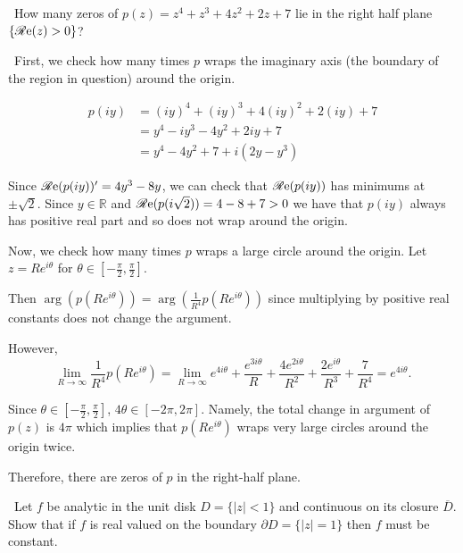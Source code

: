 \documentclass[12pt]{Qual}
\begin{document}
\newpage

\begin{problem} $\,$
How many zeros of $p(z)=z^4+z^3+4z^2+2z+7$ lie in the right half plane $\{\mathscr{R}\text{e}(z)>0\}$?
\end{problem}


\begin{solution}$\,$
First, we check how many times $p$ wraps the imaginary axis (the boundary of the region in question) around the origin.

\begin{align*}
    p(iy)&=(iy)^4+(iy)^3+4(iy)^2+2(iy)+7\\
    &=y^4-iy^3-4y^2+2iy+7\\
    &=y^4-4y^2+7+i(2y-y^3)
\end{align*}

Since $\mathscr{R}\text{e}(p(iy))'=4y^3-8y$, we can check that $\mathscr{R}\text{e}(p(iy))$ has minimums at $\pm\sqrt{2}$. Since $y\in\mathbb{R}$ and $\mathscr{R}\text{e}(p(i\sqrt{2}))=4-8+7>0$ we have that $p(iy)$ always has positive real part and so does not wrap around the origin.

Now, we check how many times $p$ wraps a large circle around the origin. Let $z=Re^{i\theta}$ for $\theta\in[-\frac{\pi}{2},\frac{\pi}{2}]$.

Then $\arg(p(Re^{i\theta}))=\arg(\frac{1}{R^4}p(Re^{i\theta}))$ since multiplying by positive real constants does not change the argument.

However, $$\lim_{R\to\infty}\frac{1}{R^4}p(Re^{i\theta})=\lim_{R\to\infty}e^{4i\theta}+\frac{e^{3i\theta}}{R}+\frac{4e^{2i\theta}}{R^2}+\frac{2e^{i\theta}}{R^3}+\frac{7}{R^4}=e^{4i\theta}.$$

Since $\theta\in[-\frac{\pi}{2},\frac{\pi}{2}]$, $4\theta\in[-2\pi,2\pi]$. Namely, the total change in argument of $p(z)$ is $4\pi$ which implies that $p(Re^{i\theta})$ wraps very large circles around the origin twice.

Therefore, there are  zeros of $p$ in the right-half plane.
\end{solution}
\newpage

\begin{problem} $\,$
Let $f$ be analytic in the unit disk $D=\{|z|<1\}$ and continuous on its closure $\overline{D}$. Show that if $f$ is real valued on the boundary $\partial D=\{|z|=1\}$ then $f$ must be constant.
\end{problem}
\end{document}
